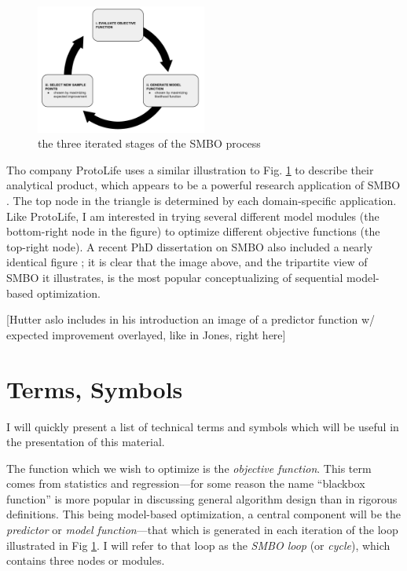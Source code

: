 \begin{figure}[h]
	\centering
	\includegraphics[width=0.5\textwidth]{EGO_cycle}
	\caption{the three iterated stages of the SMBO process}
	\label{fig:smbo_cycle}

\end{figure}

Tho company ProtoLife uses a similar illustration to Fig. \ref{fig:smbo_cycle} to describe their analytical product, which appears to be a powerful research application of SMBO \citep{protolife_pdt_2013}. The top node in the triangle is determined by each domain-specific application. Like ProtoLife, I am interested in trying several different model modules (the bottom-right node in the figure) to optimize different objective functions (the top-right node). A recent PhD dissertation on SMBO also included a nearly identical figure \cite{hutter_sequential_2011}; it is clear that the image above, and the tripartite view of SMBO it illustrates, is the most popular conceptualizing of sequential model-based optimization.

[Hutter aslo includes in his introduction an image of a predictor function w/ expected improvement overlayed, like in Jones, right here]

\section{Terms, Symbols}

I will quickly present a list of technical terms and symbols which will be useful in the presentation of this material.

The function which we wish to optimize is the \emph{objective function}. This term comes from statistics and regression---for some reason the name ``blackbox function'' is more popular in discussing general algorithm design than in rigorous definitions. This being model-based optimization, a central component will be the \emph{predictor} or \emph{model function}---that which is generated in each iteration of the loop illustrated in Fig \ref{fig:smbo_cycle}. I will refer to that loop as the \emph{SMBO loop} (or \emph{cycle}), which contains three nodes or modules. 


